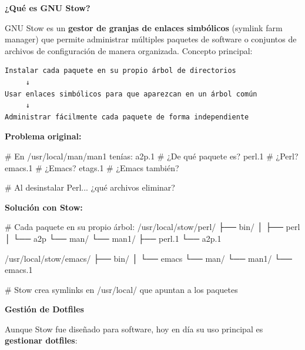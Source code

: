 \documentclass[
  doc,
  floatsintext,
  longtable,
  a4paper,
  nolmodern,
  notxfonts,
  notimes,
  12pt,
  colorlinks=true,linkcolor=blue,citecolor=blue,urlcolor=blue]{apa7}
\newenvironment{Shaded}{\begin{snugshade}}{\end{snugshade}}
\newcommand{\CommentTok}[1]{\textcolor[rgb]{0.37,0.37,0.37}{#1}}
\newcommand{\ExtensionTok}[1]{\textcolor[rgb]{0.00,0.23,0.31}{#1}}
\newcommand{\NormalTok}[1]{\textcolor[rgb]{0.00,0.23,0.31}{#1}}
\begin{document}
\textbf{¿Qué es GNU Stow?}

GNU Stow es un \textbf{gestor de granjas de enlaces simbólicos} (symlink
farm manager) que permite administrar múltiples paquetes de software o
conjuntos de archivos de configuración de manera organizada. Concepto
principal:

\begin{verbatim}
Instalar cada paquete en su propio árbol de directorios
     ↓
Usar enlaces simbólicos para que aparezcan en un árbol común
     ↓
Administrar fácilmente cada paquete de forma independiente
\end{verbatim}

\textbf{Problema original:}

\begin{Shaded}
\begin{Highlighting}[]
\CommentTok{\# En /usr/local/man/man1 tenías:}
\ExtensionTok{a2p.1}      \CommentTok{\# ¿De qué paquete es?}
\ExtensionTok{perl.1}     \CommentTok{\# ¿Perl?}
\ExtensionTok{emacs.1}    \CommentTok{\# ¿Emacs?}
\ExtensionTok{etags.1}    \CommentTok{\# ¿Emacs también?}

\CommentTok{\# Al desinstalar Perl... ¿qué archivos eliminar?}
\end{Highlighting}
\end{Shaded}

\textbf{Solución con Stow:}

\begin{Shaded}
\begin{Highlighting}[]
\CommentTok{\# Cada paquete en su propio árbol:}
\ExtensionTok{/usr/local/stow/perl/}
\ExtensionTok{├──}\NormalTok{ bin/}
\ExtensionTok{│}\NormalTok{   ├── perl}
\ExtensionTok{│}\NormalTok{   └── a2p}
\ExtensionTok{└──}\NormalTok{ man/}
    \ExtensionTok{└──}\NormalTok{ man1/}
        \ExtensionTok{├──}\NormalTok{ perl.1}
        \ExtensionTok{└──}\NormalTok{ a2p.1}

\ExtensionTok{/usr/local/stow/emacs/}
\ExtensionTok{├──}\NormalTok{ bin/}
\ExtensionTok{│}\NormalTok{   └── emacs}
\ExtensionTok{└──}\NormalTok{ man/}
    \ExtensionTok{└──}\NormalTok{ man1/}
        \ExtensionTok{└──}\NormalTok{ emacs.1}

\CommentTok{\# Stow crea symlinks en /usr/local/ que apuntan a los paquetes}
\end{Highlighting}
\end{Shaded}

\textbf{Gestión de Dotfiles}

Aunque Stow fue diseñado para software, hoy en día su uso principal es
\textbf{gestionar dotfiles}:
\end{document}
